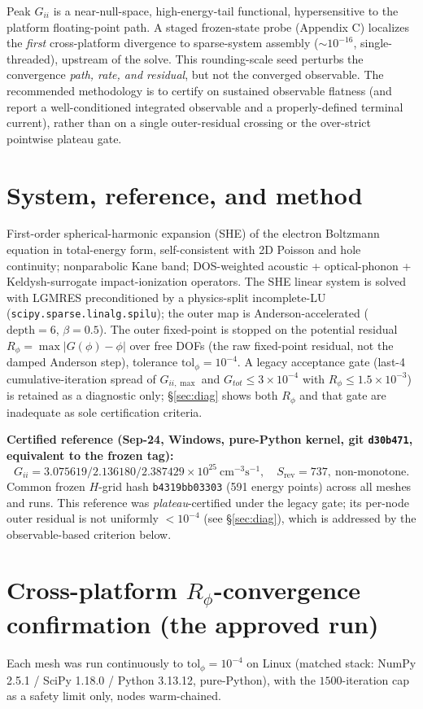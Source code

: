 \documentclass[11pt]{article}
\newcommand{\ten}[1]{\times 10^{#1}}
\begin{document}
Peak $G_{ii}$ is a near-null-space, high-energy-tail functional, hypersensitive to the platform floating-point path. A staged frozen-state probe (Appendix C) localizes the \emph{first} cross-platform divergence to sparse-system assembly ($\sim\!10^{-16}$, single-threaded), upstream of the solve. This rounding-scale seed perturbs the convergence \emph{path, rate, and residual}, but not the converged observable. The recommended methodology is to certify on sustained observable flatness (and report a well-conditioned integrated observable and a properly-defined terminal current), rather than on a single outer-residual crossing or the over-strict pointwise plateau gate.

\section{System, reference, and method}
First-order spherical-harmonic expansion (SHE) of the electron Boltzmann equation in total-energy form, self-consistent with 2D Poisson and hole continuity; nonparabolic Kane band; DOS-weighted acoustic + optical-phonon + Keldysh-surrogate impact-ionization operators. The SHE linear system is solved with LGMRES preconditioned by a physics-split incomplete-LU (\texttt{scipy.sparse.linalg.spilu}); the outer map is Anderson-accelerated ($\text{depth}=6$, $\beta=0.5$). The outer fixed-point is stopped on the potential residual $R_\phi=\max|G(\phi)-\phi|$ over free DOFs (the raw fixed-point residual, not the damped Anderson step), tolerance $\mathrm{tol}_\phi=10^{-4}$. A legacy acceptance gate (last-4 cumulative-iteration spread of $G_{ii,\max}$ and $G_{tot}\le3\ten{-4}$ with $R_\phi\le1.5\ten{-3}$) is retained as a diagnostic only; \S\ref{sec:diag} shows both $R_\phi$ and that gate are inadequate as sole certification criteria.

\textbf{Certified reference (Sep-24, Windows, pure-Python kernel, git \texttt{d30b471}, equivalent to the frozen tag):}
\[
G_{ii}=3.075619/2.136180/2.387429\ten{25}\ \mathrm{cm^{-3}s^{-1}},\quad S_{\mathrm{rev}}=737,\ \text{non-monotone.}
\]
Common frozen $H$-grid hash \texttt{b4319bb03303} (591 energy points) across all meshes and runs. This reference was \emph{plateau}-certified under the legacy gate; its per-node outer residual is not uniformly $<10^{-4}$ (see \S\ref{sec:diag}), which is addressed by the observable-based criterion below.

\section{Cross-platform $R_\phi$-convergence confirmation (the approved run)}\label{sec:confirm}
Each mesh was run continuously to $\mathrm{tol}_\phi=10^{-4}$ on Linux (matched stack: NumPy 2.5.1 / SciPy 1.18.0 / Python 3.13.12, pure-Python), with the $1500$-iteration cap as a safety limit only, nodes warm-chained.
\end{document}
